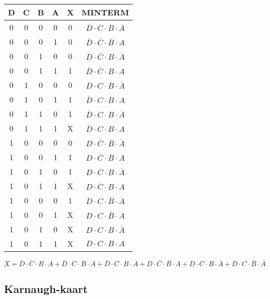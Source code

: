 \documentclass[11pt, a4paper]{report}
\begin{document}
\begin{tabular}{| c c c c || c | c |}
  \hline
  D & C & B & A & X & MINTERM \\
  \hline
  0 & 0 & 0 & 0 & 0 & $ \overline{D}\cdot\overline{C}\cdot\overline{B}\cdot\overline{A}$ \\
  0 & 0 & 0 & 1 & 0 & $ \overline{D}\cdot\overline{C}\cdot\overline{B}\cdot A $ \\
  0 & 0 & 1 & 0 & 0 & $ \overline{D}\cdot\overline{C}\cdot B \cdot\overline{A}$ \\
  0 & 0 & 1 & 1 & 1 & $ \overline{D}\cdot\overline{C}\cdot B \cdot A $ \\
  \hline
  0 & 1 & 0 & 0 & 0 & $ \overline{D}\cdot C \cdot\overline{B}\cdot\overline{A}$ \\
  0 & 1 & 0 & 1 & 1 & $ \overline{D}\cdot C \cdot\overline{B}\cdot A $ \\
  0 & 1 & 1 & 0 & 1 & $ \overline{D}\cdot C \cdot B \cdot\overline{A}$ \\
  0 & 1 & 1 & 1 & X & $ \overline{D}\cdot C \cdot B \cdot A $ \\
  \hline
  1 & 0 & 0 & 0 & 0 & $ D \cdot\overline{C}\cdot\overline{B}\cdot\overline{A}$ \\
  1 & 0 & 0 & 1 & 1 & $ D \cdot\overline{C}\cdot\overline{B}\cdot A $ \\
  1 & 0 & 1 & 0 & 1 & $ D \cdot\overline{C}\cdot B \cdot\overline{A}$ \\
  1 & 0 & 1 & 1 & X & $ D \cdot\overline{C}\cdot B \cdot A $ \\
  \hline
  1 & 0 & 0 & 0 & 1 & $ D \cdot C \cdot\overline{B}\cdot\overline{A}$ \\
  1 & 0 & 0 & 1 & X & $ D \cdot C \cdot\overline{B}\cdot A $ \\
  1 & 0 & 1 & 0 & X & $ D \cdot C \cdot B \cdot\overline{A}$ \\
  1 & 0 & 1 & 1 & X & $ D \cdot C \cdot B \cdot A $ \\
  \hline
\end{tabular}

\begin{equation*}
  X =
  \overline{D}\cdot\overline{C}\cdot B \cdot A +
  \overline{D}\cdot C \cdot\overline{B}\cdot A +
  \overline{D}\cdot C \cdot B \cdot\overline{A} +
  D \cdot\overline{C}\cdot\overline{B}\cdot A  +
  D \cdot\overline{C}\cdot B \cdot\overline{A} +
  D \cdot C \cdot\overline{B}\cdot\overline{A}
\end{equation*}

\subsection*{Karnaugh-kaart}
\end{document}
